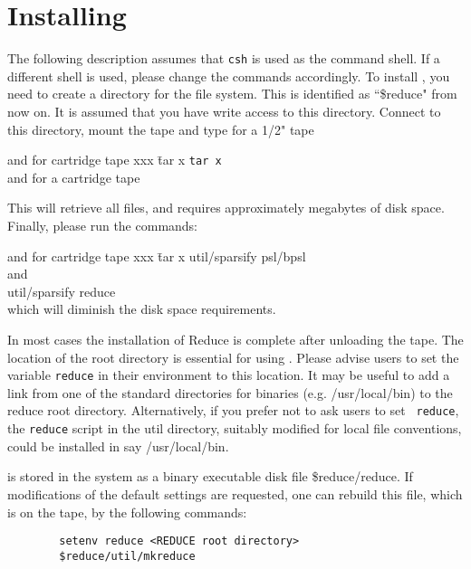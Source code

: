 \section{Installing {\REDUCE}}
The following description assumes that {\tt csh} is used as the command shell.
If a different shell is used, please change the commands accordingly.
To install {\REDUCE}, you need to create a directory for the {\REDUCE} file
system.  This is identified as ``\$reduce" from now on.  It is assumed
that you have write access to this directory.  Connect to this directory,
mount the tape and type for a 1/2" tape
\begin{center}
\begin{tabbing}
and for cartridge tape xxx \= tar x \kill
                                          \> {\tt tar x} \\
and for a cartridge tape \\
                                          \> {\cartridgecommand}
\end{tabbing}
\end{center}
This will retrieve all files, and requires approximately {\tapespace}
megabytes of disk space.
Finally, please run the commands:
\begin{center}
\begin{tabbing}
and for cartridge tape xxx \= tar x \kill
                                          \> util/sparsify psl/bpsl \\
and \\
                                          \> util/sparsify reduce \\
which will diminish the disk space requirements.
\end{tabbing}
\end{center}

In most cases the installation of Reduce is complete after unloading the
tape.  The location of the {\REDUCE} root directory is essential for using
{\REDUCE}.  Please advise users to set the variable {\tt reduce} in their
environment to this location.  It may be useful to add a link from one of
the standard directories for binaries (e.g. /usr/local/bin) to the reduce
root directory.  Alternatively, if you prefer not to ask users to set {\tt
reduce}, the {\tt reduce} script in the util directory, suitably modified
for local file conventions, could be installed in say /usr/local/bin.

{\REDUCE} is stored in the system as a binary executable disk file 
\$reduce/reduce. 
If modifications of the default settings are requested, one can rebuild 
this file, which is on the tape, by the following commands:
\begin{verbatim}
        setenv reduce <REDUCE root directory>
        $reduce/util/mkreduce
\end{verbatim}

